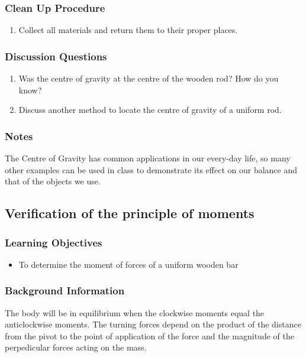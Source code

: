 \subsubsection*{Clean Up Procedure}
\begin{enumerate}
\item{Collect all materials and return them to their proper places.} 
\end{enumerate}

\subsubsection*{Discussion Questions}
\begin{enumerate}
\item{Was the centre of gravity at the centre of the wooden rod? How do you know?}
\item{Discuss another method to locate the centre of gravity of a uniform rod.} 
\end{enumerate}

\subsubsection*{Notes}
The Centre of Gravity has common applications in our every-day life, so many other examples can be used in class to demonstrate its effect on our balance and that of the objects we use.  


\subsection{Verification of the principle of moments}

\subsubsection*{Learning Objectives}
\begin{itemize}
\item{To determine the moment of forces of a uniform wooden bar}
\end{itemize}

\subsubsection*{Background Information}
The body will be in equilibrium when the clockwise moments equal the anticlockwise moments. The turning forces depend on the product of the distance from the pivot to the point of application of the force and the magnitude of the perpedicular forces acting on the mass.  

